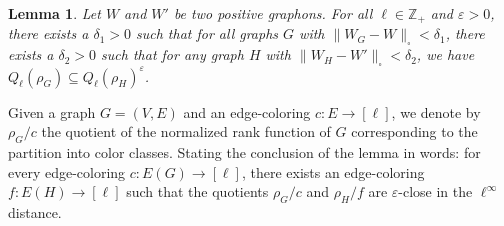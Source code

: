 \documentclass[10pt]{article}
\theoremstyle{plain}
\newtheorem{lem}[thm]{Lemma}
\theoremstyle{definition}
\newcommand{\bbZ}{\mathbb{Z}}
\newcommand{\eps}{\varepsilon}
\begin{document}
\begin{lem}\label{LEM:DENSE_CYCLIC_CLOSE}
Let $W$ and $W'$ be two positive graphons. For all $\ell\in\bbZ_+$ and $\varepsilon>0$, there exists a $\delta_1>0$ such that for all graphs $G$ with $\|W_G-W\|_\square<\delta_1$, there exists a $\delta_2>0$ such that for any graph $H$ with $\|W_H-W'\|_\square<\delta_2$, we have $Q_\ell(\rho_{G})\subseteq Q_\ell(\rho_{H})^\eps$.
\end{lem}

Given a graph $G=(V,E)$ and an edge-coloring $c\colon E\to[\ell]$, we denote by $\rho_G/c$ the quotient of the normalized rank function of $G$ corresponding to the partition into color classes. Stating the conclusion of the lemma in words: for every edge-coloring $c\colon E(G)\to[\ell]$, there exists an edge-coloring $f\colon E(H)\to[\ell]$ such that the quotients $\rho_G/c$ and $\rho_H/f$ are $\varepsilon$-close in the $\ell^{\infty}$ distance.
\end{document}
